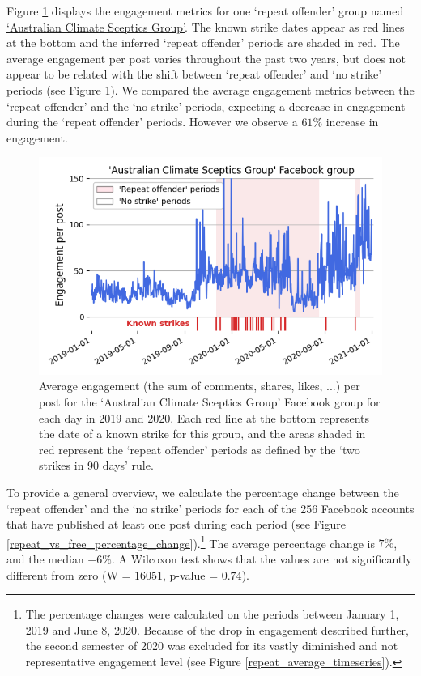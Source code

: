 \documentclass[11pt,a4paper]{article}
\begin{document}
Figure \ref{repeat_example_timeseries} displays the engagement metrics for one `repeat offender' group named \href{https://www.facebook.com/groups/108655705888371/}{`Australian Climate Sceptics Group'}. 
The known strike dates appear as red lines at the bottom and the inferred ‘repeat offender’ periods are shaded in red. 
The average engagement per post varies throughout the past two years, but does not appear to be related with the shift between `repeat offender' and `no strike' periods (see Figure \ref{repeat_example_timeseries}).
We compared the average engagement metrics between the `repeat offender' and the `no strike' periods, expecting a decrease in engagement during the `repeat offender' periods. 
However we observe a $61\%$ increase in engagement.

\begin{figure}[!h]
\centering
\includegraphics[width=\linewidth]{./../figure/repeat_example_timeseries.png}
\caption{Average engagement (the sum of comments, shares, likes, ...) per post for the `Australian Climate Sceptics Group' Facebook group for each day in 2019 and 2020. Each red line at the bottom represents the date of a known strike for this group, and the areas shaded in red represent the `repeat offender' periods as defined by the ‘two strikes in 90 days’ rule.}
\label{repeat_example_timeseries}
\end{figure}

To provide a general overview, we calculate the percentage change between the `repeat offender' and the `no strike' periods for each of the 256 Facebook accounts that have published at least one post during each period (see Figure \ref{repeat_vs_free_percentage_change}).\footnote{The percentage changes were calculated on the periods between January 1, 2019 and June 8, 2020. Because of the drop in engagement described further, the second semester of 2020 was excluded for its vastly diminished and not representative engagement level (see Figure \ref{repeat_average_timeseries}).}
The average percentage change is $7\%$, and the median $-6\%$. 
A Wilcoxon test shows that the values are not significantly different from zero (W = $16051$, p-value = $0.74$).
\end{document}
